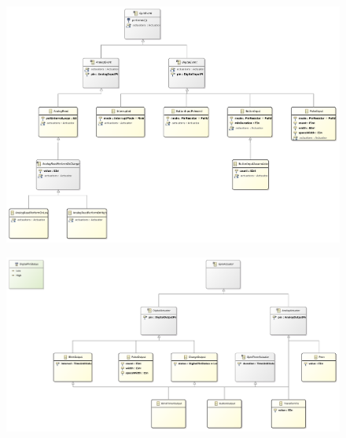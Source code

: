 \begin{figure}
	\centering
    \includegraphics[height=0.3\textheight]{images/models/gpiosevents_class_diagram.pdf}
    \label{fig:modelo_iot_gpio_events_classes}
\end{figure}

\begin{figure}
	\centering
    \includegraphics[height=0.3\textheight]{images/models/gpiosactuators_class_diagram.pdf}
    \label{fig:modelo_iot_gpio_actuators_classes}
\end{figure}
